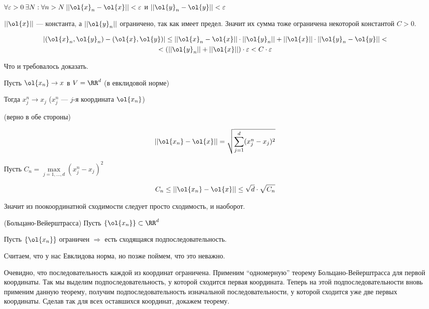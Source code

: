 \( \forall \varepsilon > 0 \: \exists N : \forall n > N \: || \ol{x}_n - \ol{x} || < \varepsilon \)
и \( || \ol{y}_n - \ol{y} || < \varepsilon \)

\( || \ol{x} || \) --- константа, а \( || \ol{y}_n || \) ограничено, так как имеет предел.
Значит их сумма тоже ограничена некоторой константой \( C > 0 \).

\begin{gather*}
    | (\ol{x}_n, \ol{y}_n) - (\ol{x}, \ol{y}) |
    \leq
    || \ol{x}_n - \ol{x} || \cdot || \ol{y}_n || + || \ol{x} || \cdot || \ol{y}_n - \ol{y} ||
    <
    \\
    <
    ( || \ol{y}_n || + || \ol{x} || ) \cdot \varepsilon
    <
    C \cdot \varepsilon
\end{gather*}

Что и требовалось доказать.

\begin{thrm}{}{}
    Пусть \( \ol{x_n} \to x \) в \( V = \RR^d \) (в евклидовой норме)

    Тогда \( x_j^n \to x_j \) (\( x_j^n \) --- \( j \)-я координата \( \ol{x_n} \))

    (верно в обе стороны)
\end{thrm}

\[
    || \ol{x_n} - \ol{x} || = \sqrt{\sum\limits_{j = 1}^{d} (x_j^n - x_j)^2}
\]

Пусть \( C_n = \max\limits_{j = 1, \ldots, d} (x_j^n - x_j)^2 \)

\[
    C_n \leq || \ol{x_n} - \ol{x} || \leq \sqrt{d} \cdot \sqrt{C_n}
\]

Значит из поокоординатной сходимости следует просто сходимость, и наоборот.

\begin{thrm}{(Больцано-Вейерштрасса)}{}
    Пусть \( \{ \ol{x_n} \} \subset \RR^d \)

    Пусть \( \{ \ol{x_n} \} \) ограничен \( \Rightarrow \) есть сходящаяся подпоследовательность.

    Считаем, что у нас Евклидова норма, но позже поймем, что это неважно.
\end{thrm}

Очевидно, что последовательность каждой из координат ограничена.
Применим ``одномерную'' теорему Больцано-Вейерштрасса для первой координаты.
Так мы выделим подпоследовательность, у которой сходится первая координата.
Теперь на этой подпоследовательности вновь применим данную теорему,
получим подпоследовательность изначальной последовательности,
у которой сходится уже две первых координаты.
Сделав так для всех оставшихся координат, докажем теорему.

